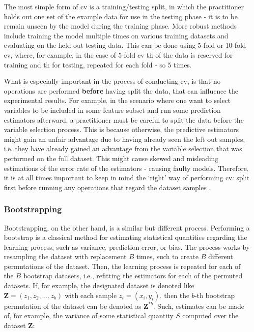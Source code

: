\documentclass{article}
\begin{document}
The most simple form of \gls{cv} is a training/testing split, in which the practitioner holds out one set of the example data for use in the testing phase - it is to be remain unseen by the model during the training phase. More robust methods include training the model multiple times on various training datasets and evaluating on the held out testing data. This can be done using 5-fold or 10-fold \gls{cv}, where, for example, in the case of 5-fold \gls{cv} th of the data is reserved for training and th for testing, repeated for each fold - so 5 times.

What is especially important in the process of conducting \gls{cv}, is that no operations are performed \textbf{before} having split the data, that can influence the experimental results. For example, in the scenario where one want to select variables to be included in some feature subset and run some prediction estimators afterward, a practitioner must be careful to split the data before the variable selection process. This is because otherwise, the predictive estimators might gain an unfair advantage due to having already seen the left out samples, i.e. they have already gained an advantage from the variable selection that was performed on the full dataset. This might cause skewed and misleading estimations of the error rate of the estimators - causing faulty models. Therefore, it is at all times important to keep in mind the `right' way of performing \gls{cv}: split first before running any operations that regard the dataset samples \citep{ambroise_selection_2002}.

\subsubsection{Bootstrapping}\label{section:bootstrapping}
Bootstrapping, on the other hand, is a similar but different process. Performing a bootstrap is a classical method for estimating statistical quantities regarding the learning process, such as variance, prediction error, or bias. The process works by resampling the dataset with replacement $B$ times, such to create $B$ different permutations of the dataset. Then, the learning process is repeated for each of the $B$ bootstrap datasets, i.e., refitting the estimators for each of the permuted datasets. If, for example, the designated dataset is denoted like $\mathbf{Z}=\left(z_{1}, z_{2}, \ldots, z_{b}\right)$ with each sample $z_{i}=\left(x_{i}, y_{i}\right)$, then the $b$-th bootstrap permutation of the dataset can be denoted as $\mathbf{Z}^{* b}$. Such, estimates can be made of, for example, the variance of some statistical quantity $S$ computed over the dataset $\mathbf{Z}$:
\end{document}

